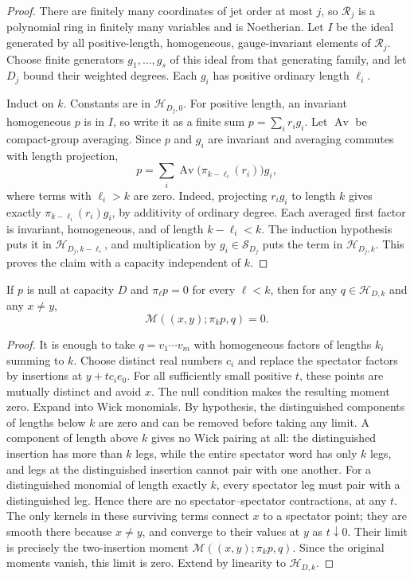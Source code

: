 \begin{proof}
There are finitely many coordinates of jet order at most $j$, so
$\mathcal R_j$ is a polynomial ring in finitely many variables and is
Noetherian.  Let $I$ be the ideal generated by all positive-length,
homogeneous, gauge-invariant elements of $\mathcal R_j$.  Choose finite
generators $g_1,\ldots,g_s$ of this ideal from that generating family,
and let $D_j$ bound their weighted degrees.  Each $g_i$ has positive
ordinary length $\ell_i$.

Induct on $k$.  Constants are in $\mathcal H_{D_j,0}$.  For positive
length, an invariant homogeneous $p$ is in $I$, so write it as a finite
sum $p=\sum_i r_i g_i$.  Let $\operatorname{Av}$ be compact-group
averaging.  Since $p$ and $g_i$ are invariant and averaging commutes with
length projection,
\[
 p=\sum_i \operatorname{Av}\bigl(\pi_{k-\ell_i}(r_i)\bigr)g_i,
\]
where terms with $\ell_i>k$ are zero.  Indeed, projecting $r_i g_i$ to
length $k$ gives exactly $\pi_{k-\ell_i}(r_i)g_i$, by additivity of
ordinary degree.  Each averaged first factor is invariant, homogeneous,
and of length $k-\ell_i<k$.  The induction hypothesis puts it in
$\mathcal H_{D_j,k-\ell_i}$, and multiplication by $g_i\in\mathcal S_{D_j}$
puts the term in $\mathcal H_{D_j,k}$.  This proves the claim with a
capacity independent of $k$.
\end{proof}

\begin{lemma}
\label{lem:free-coalescence}
If $p$ is null at capacity $D$ and $\pi_\ell p=0$ for every $\ell<k$,
then for any $q\in\mathcal H_{D,k}$ and any $x\ne y$,
\[
 \mathcal M((x,y);\pi_kp,q)=0.
\]
\end{lemma}

\begin{proof}
It is enough to take $q=v_1\cdots v_m$ with homogeneous factors of
lengths $k_i$ summing to $k$.  Choose distinct real numbers $c_i$ and
replace the spectator factors by insertions at $y+t c_i e_0$.  For all
sufficiently small positive $t$, these points are mutually distinct and
avoid $x$.  The null condition makes the resulting moment zero.  Expand
into Wick monomials.  By hypothesis, the distinguished components of
lengths below $k$ are zero and can be removed before taking any limit.  A
component of length above $k$ gives no Wick pairing at all: the distinguished
insertion has more than $k$ legs, while the entire spectator word has only
$k$ legs, and legs at the distinguished insertion cannot pair with one
another.  For a distinguished monomial of length exactly $k$, every
spectator leg must pair with a distinguished leg.  Hence there are no
spectator--spectator contractions, at any $t$.  The only kernels in these
surviving terms connect $x$ to a spectator point; they are smooth there
because $x\ne y$, and converge to their values at $y$ as $t\downarrow0$.
Their limit is precisely the two-insertion moment
$\mathcal M((x,y);\pi_kp,q)$.  Since the original moments vanish, this
limit is zero.  Extend by linearity to $\mathcal H_{D,k}$.
\end{proof}

